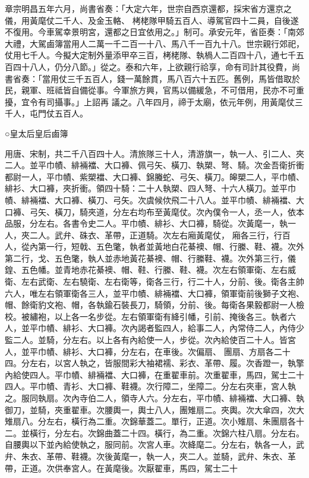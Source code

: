 \begin{pinyinscope}
 章宗明昌五年六月，尚書省奏：「大定六年，世宗自西京還都，採宋省方還京之儀，用黃麾仗二千人、及金玉輅、
 栲栳隊甲騎五百人、導駕官四十二員，自後遂不復用。今車駕幸景明宮，還都之日宜依用之。」制可。承安元年，省臣奏：「南郊大禮，大駕鹵簿當用人二萬一千二百一十八、馬八千一百九十八。世宗親行郊祀，仗用七千人。今擬大定制外量添甲卒三百，栲栳隊、執楇人二百四十八，通七千五百四十八人，仍分八節。」從之。泰和六年，上欲親行祫享，命有司計其役費，尚書省奏：「當用仗三千五百人，錢一萬餘貫，馬八百六十五匹。舊例，馬皆借取於民，親軍、班祗皆自備從事。今軍旅方興，官馬以備緩急，不可借用，民亦不可重擾，宜令有司攝事。」上詔再
 議之。八年四月，禘于太廟，依元年例，用黃麾仗三千人，屯門仗五百人。



 ○皇太后皇后鹵簿



 用唐、宋制，共二千八百四十人。清旅隊三十人，清游旗一，執一人、引二人、夾二人。並平巾幘、緋裲襠、大口褲、佩弓矢、橫刀、執槊、弩、騎。次金吾衛折衝都尉一人，平巾幘、紫槊襠、大口褲、錦螣蛇、弓矢、橫刀。皞槊二人，平巾幘、緋衫、大口褲，夾折衝。領四十騎：二十人執槊、四人弩、十六人橫刀。並平巾幘、緋裲襠、大口褲、橫刀、弓矢。次虞候佽飛二十八人。並平巾幘、緋裲襠、大口褲、弓矢、橫刀，騎夾道，分左右均布至黃麾仗。次內僕令一人，丞一人，依本品服，分左右。各書令史二人。平巾幘、緋衫、大口褲，騎從。次黃麾一，執一人，夾二人。武弁、硃衣、革帶，正道騎。次左右廂黃麾仗，
 廂各三行，行百人，從內第一行，短戟、五色氅，執者並黃地白花綦襖、帽、行縢、鞋、襪。次外第二行，戈、五色氅，執人並赤地黃花綦襖、帽、行縢鞋、襪。次外第三行，儀鍠、五色幡。並青地赤花綦襖、帽、鞋、行縢、鞋、襪。次左右領軍衛、左右威衛、左右武衛、左右驍衛、左右衛等，衛各三行，行二十人，分前、後。衛各主帥六人，唯左右領軍衛各三人，並平巾幘、緋裲襠、大口褲，領軍衛前後獅子文袍、帽、餘衛豹文袍、帽，各執鍮石裝長刀，騎領，分前、後。每衛各果毅都尉一人檢校。被繡袍，以上各一名步從。左右領軍衛有絳引幡，引前、掩後各三。執者六人，並平巾幘、緋衫、大口褲。次內謁者監四人，給事二人，內常侍二人，內侍少監二人。並騎，分左右。以上各有內給使一人，步從。次內給使百二十人。皆宮人，並平巾幘、緋衫、大口褲，分左右，在車後。次偏扇、
 團扇、方扇各二十四。分左右，以宮人執之，皆服間彩大袖裙襦、彩衣、革帶、履。次香蹬一，執擎內給使四人。平巾幘、緋裲襠、大口褲，在重翟車前。次重翟車，馬四，駕士二十四人。平巾幘、青衫、大口褲、鞋襪。次行障二，坐障二。分左右夾車，宮人執之。服同執扇。次內寺伯二人，領寺人六。分左右，平巾幘、緋裲襠、大口褲、執御刀，並騎，夾重翟車。次腰輿一，輿士八人，團雉扇二。夾輿。次大傘四，次大雉扇八。分左右，橫行為二重。次錦華蓋二。單行，正道。次小雉扇、朱團扇各十二。並橫行，分左右。次錦曲蓋二十四。橫行，為二重。次錦六柱八扇。分左右。自腰輿以下並內給使執之，服同前。次宮人車。次絳麾二。分左右，執各一人，武弁、朱衣、革帶、鞋襪。次後黃麾一，執一人，夾二人。並騎，武弁、朱衣、革帶，正道。次供奉宮人。在黃麾後。次厭翟車，馬四，駕士二十

\end{pinyinscope}
